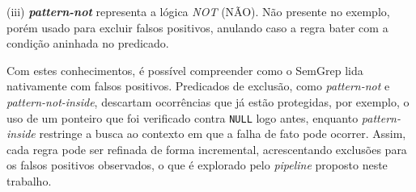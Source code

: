 \documentclass[
    12pt,                %
    openright,           %
    oneside,             %
    a4paper,             %
    english,             %
    brazil               %
]{abntex2}
\begin{document}
\par
(iii) \textbf{\textit{pattern-not}} representa a lógica \textit{NOT} (NÃO).
Não presente no exemplo, porém usado para excluir falsos positivos, anulando caso a regra bater com a condição aninhada no predicado.
\par
Com estes conhecimentos, é possível compreender como o SemGrep lida nativamente com falsos positivos.
Predicados de exclusão, como \textit{pattern-not} e \textit{pattern-not-inside}, descartam ocorrências que já estão protegidas, por exemplo, o uso de um ponteiro que foi verificado contra \texttt{NULL} logo antes, enquanto \textit{pattern-inside} restringe a busca ao contexto em que a falha de fato pode ocorrer.
Assim, cada regra pode ser refinada de forma incremental, acrescentando exclusões para os falsos positivos observados, o que é explorado pelo \textit{pipeline} proposto neste trabalho.
\end{document}
